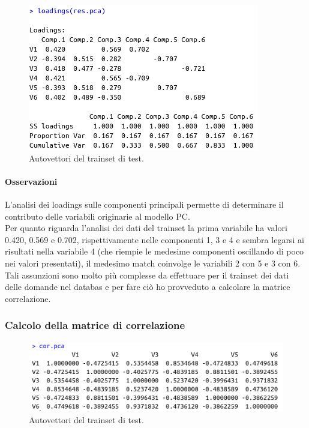 \begin{figure}[H]
\centering
	\includegraphics[width=0.60\linewidth]{../../PCA/plot/loadings_rete-prova.png}
	\caption{Autovettori del trainset di test.}
	\label{Autovettori del trainset di test.}
\end{figure}

\paragraph{Osservazioni}
L'analisi dei loadings sulle componenti principali permette di determinare il contributo delle variabili originarie al modello PC.\\
Per quanto riguarda l'analisi dei dati del trainset  la prima variabile ha valori  0.420, 0.569 e 0.702,  rispettivamente nelle componenti 1, 3 e 4 e sembra legarsi ai risultati nella variabile 4 (che riempie le medesime componenti oscillando di poco nei valori presentati), il medesimo match coinvolge le variabili 2 con 5 e 3 con 6.\\
Tali assunzioni sono molto pi\`u complesse da effettuare per  il trainset dei dati delle domande nel databas e  per fare ci\`o ho provveduto a calcolare la matrice correlazione.

\subsubsection{Calcolo della matrice di correlazione}
\label{Calcolo della matrice di correlazione}

\begin{figure}[H]
\centering
	\includegraphics[width=0.60\linewidth]{../../PCA/plot/correlazione_rete-prova.png}
	\caption{Autovettori del trainset di test.}
	\label{Autovettori del trainset di test.}
\end{figure}

